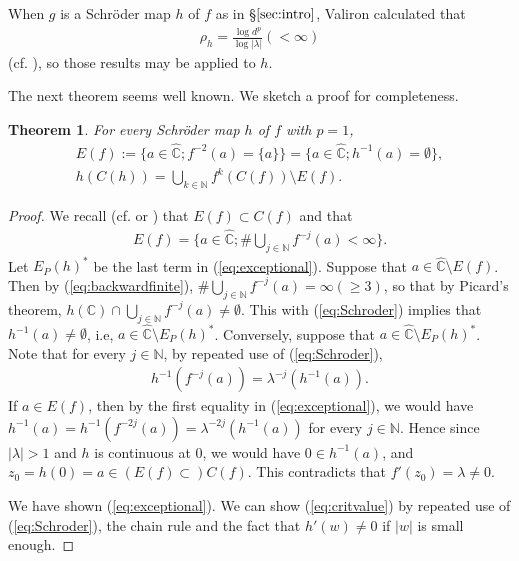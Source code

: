 \documentclass[a4paper,12pt]{amsart}
\theoremstyle{plain}
\newtheorem{theorem}[equation]{Theorem}
\theoremstyle{definition}
\theoremstyle{remark}
\numberwithin{equation}{section}
\begin{document}
{\smallskip {}\nopagebreak[4]}
When $g$ is a Schr\"oder map $h$ of $f$ as in \S $\ref{sec:intro}$, 
Valiron calculated that
\begin{gather}
 \rho_h=\frac{\log d^{p}}{\log|\lambda|}(<\infty)\label{eq:Valiron} 
\end{gather}
(cf. \cite[p.\ 160]{Valiron54}), 
so those results may be applied to $h$.

The next theorem seems well known. We sketch a proof for completeness.

\begin{theorem}\label{th:critvalue} 
For every Schr\"oder map $h$ of $f$ with $p=1$,
\begin{gather}
 E(f):=\{a\in{\hat{\mathbb{C}}};f^{-2}(a)=\{a\}\}=\{a\in{\hat{\mathbb{C}}};h^{-1}(a)=\emptyset\},\label{eq:exceptional}\\
 h(C(h))=\bigcup_{k\in{\mathbb{N}}}f^k(C(f))\setminus E(f).\label{eq:critvalue}
\end{gather}
\end{theorem}

\begin{proof}
 We recall (cf. \cite[Lemma 4.9]{Milnor3rd} or \cite[Theorem 2.3.3]{MorosawaTaniguchi}) that $E(f)\subset C(f)$ and that
\begin{gather}
  E(f)=\{a\in{\hat{\mathbb{C}}};\#\bigcup_{j\in{\mathbb{N}}}f^{-j}(a)<\infty\}.\label{eq:backwardfinite}
 \end{gather}
 Let $E_P(h)^*$ be the last term in (\ref{eq:exceptional}).
 Suppose that $a\in{\hat{\mathbb{C}}}\setminus E(f)$. 
 Then by (\ref{eq:backwardfinite}), $\#\bigcup_{j\in{\mathbb{N}}}f^{-j}(a)=\infty(\ge 3)$, 
 so that by Picard's theorem,
 $h({\mathbb{C}})\cap\bigcup_{j\in{\mathbb{N}}}f^{-j}(a)\neq\emptyset$.
 This with (\ref{eq:Schroder}) implies that $h^{-1}(a)\neq\emptyset$,
 i.e, $a\in{\hat{\mathbb{C}}}\setminus E_P(h)^*$. Conversely,
 suppose that $a\in{\hat{\mathbb{C}}}\setminus E_P(h)^*$.
 Note that for every $j\in{\mathbb{N}}$, by repeated use of (\ref{eq:Schroder}),
 \begin{gather}
  h^{-1}(f^{-j}(a))=\lambda^{-j}(h^{-1}(a)).\label{eq:pullbackpreimage}
 \end{gather} 
 If $a\in E(f)$, then by the first equality in (\ref{eq:exceptional}),
 we would have $h^{-1}(a)=h^{-1}(f^{-2j}(a))=\lambda^{-2j}(h^{-1}(a))$
 for every $j\in{\mathbb{N}}$. Hence since $|\lambda|>1$ and $h$ is continuous at $0$,
 we would have $0\in h^{-1}(a)$, and $z_0=h(0)=a\in(E(f)\subset)C(f)$.
 This contradicts that $f'(z_0)=\lambda\neq 0$.

 We have shown (\ref{eq:exceptional}).
 We can show (\ref{eq:critvalue}) by repeated use of (\ref{eq:Schroder}),
 the chain rule and the fact that $h'(w)\neq 0$ if $|w|$ is small enough.
\end{proof}
\end{document}
